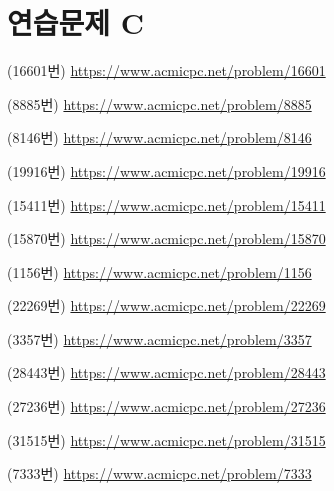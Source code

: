 \section{연습문제 C}
\begin{problem}
    (16601번) \url{https://www.acmicpc.net/problem/16601}
\end{problem}
\begin{problem}
    (8885번) \url{https://www.acmicpc.net/problem/8885}
\end{problem}
\begin{problem}
    (8146번) \url{https://www.acmicpc.net/problem/8146}
\end{problem}
\begin{problem}
    (19916번) \url{https://www.acmicpc.net/problem/19916}
\end{problem}
\begin{problem}
    (15411번) \url{https://www.acmicpc.net/problem/15411}
\end{problem}
\begin{problem}
    (15870번) \url{https://www.acmicpc.net/problem/15870}
\end{problem}
\begin{problem}
    (1156번) \url{https://www.acmicpc.net/problem/1156}
\end{problem}
\begin{problem}
    (22269번) \url{https://www.acmicpc.net/problem/22269}
\end{problem}
\begin{problem}
    (3357번) \url{https://www.acmicpc.net/problem/3357}
\end{problem}
\begin{problem}
    (28443번) \url{https://www.acmicpc.net/problem/28443}
\end{problem}
\begin{problem}
    (27236번) \url{https://www.acmicpc.net/problem/27236}
\end{problem}
\begin{problem}
    (31515번) \url{https://www.acmicpc.net/problem/31515}
\end{problem}
\begin{problem}
    (7333번) \url{https://www.acmicpc.net/problem/7333}
\end{problem}



